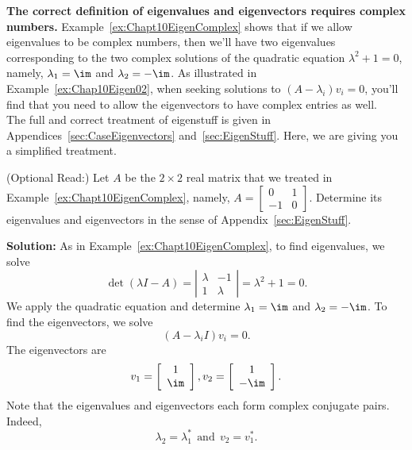 \begin{tcolorbox}[title=\textbf{\Large Full Story on Eigenstuff}]
\textbf{The correct definition of eigenvalues and eigenvectors requires complex numbers.} Example~\ref{ex:Chapt10EigenComplex} shows that if we allow eigenvalues to be complex numbers, then we'll have two eigenvalues corresponding to the two complex solutions of the quadratic equation $\lambda^2+1=0$, namely, $\lambda_1 = \im$ and $\lambda_2 = -\im$. As illustrated in Example~\ref{ex:Chap10Eigen02}, when seeking solutions to $(A-\lambda_i) v_i = 0$, you'll find that you need to allow the eigenvectors to have complex entries as well. \\ 

The full and correct treatment of eigenstuff is given in Appendices~\ref{sec:CaseEigenvectors} and~\ref{sec:EigenStuff}. Here, we are giving you a simplified treatment.
 \end{tcolorbox}   


\begin{example}
\label{ex:Chap10Eigen02} (Optional Read:) Let $A$ be the $2 \times 2$ real matrix that we treated in Example~\ref{ex:Chapt10EigenComplex}, namely,
 $A=\left[\begin{array}{rr}
    0 & 1\\
    -1 & 0
    \end{array}\right].$
Determine its eigenvalues and eigenvectors in the sense of Appendix~\ref{sec:EigenStuff}. 
\end{example}

\textbf{Solution:} As in Example~\ref{ex:Chapt10EigenComplex}, to find eigenvalues, we solve 
$$\det(\lambda I-A)= \left| \begin{array}{rr}
    \lambda & -1\\
    1 &\lambda
    \end{array} \right| =\lambda^2+1=0.$$
   We apply the quadratic equation and determine $\lambda_1 = \im$ and $\lambda_2= - \im$.  To find the eigenvectors, we solve 
   $$(A-\lambda_{i}I)v_i=0.$$
    The eigenvectors are $$v_{1}=\left[\begin{array}{c}
        1\\
        \im
    \end{array}\right],v_{2}=\left[\begin{array}{c}
        1\\
        -\im
    \end{array}\right].$$
Note that the eigenvalues and eigenvectors each form complex conjugate pairs. Indeed,
$$\lambda_2 = \lambda_1^\ast~~\text{and}~~v_2 = v_1^\ast. $$
\Qed

